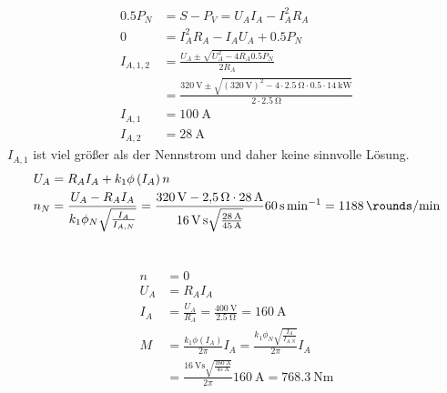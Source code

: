 \documentclass[11pt,a4paper]{scrartcl}
\newcommand{\mybr}[1]{\left(#1\right)}
\newcommand{\0}{_{\mybr{0}}}
\newcommand{\1}{_{\mybr{1}}}
\newcommand{\2}{_{\mybr{2}}}
\begin{document}
\section{}
\begin{align}
\num{0.5}P_N&=S-P_V=U_A I_A - I_A^2 R_A\\
0&=I_A^2 R_A - I_A U_A + \num{0.5}P_N\\
I_{A,1,2}&=\frac{U_A\pm\sqrt{U_A^2-4 R_A \num{0.5}P_N}}{2 R_A}\\
&=\frac{\SI{320}{\volt}\pm\sqrt{\mybr{\SI{320}{\volt}}^2-4 \cdot \SI{2.5}{\ohm}\cdot \num{0.5}\cdot\SI{14}{\kilo\watt}}}{2 \cdot \SI{2.5}{\ohm}}\\
I_{A,1}&=\SI{100}{\ampere}\\
I_{A,2}&=\SI{28}{\ampere}
\end{align}
$I_{A,1}$ ist viel größer als der Nennstrom und daher keine sinnvolle Lösung.
\begin{align}
U_A&=R_A I_A + k_1\phi\mybr{I_A} n\\
n_N&=\frac{U_A-R_A I_A}{k_1\phi_N\sqrt{\frac{I_A}{I_{A,N}}}}=\frac{\SI{320}{\volt}-\SI{2.5}{\ohm}\cdot\SI{28}{\ampere}}{\SI{16}{\volt\second}\sqrt{\frac{\SI{28}{\ampere}}{\SI{45}{\ampere}}}}\SI{60}{\second\per\minute}=\SI{1188}{\rounds\per\minute}
\end{align}

\section{}
\subsection{}
\begin{align}
n&=0\\
U_A&=R_A I_A\\
I_A&=\frac{U_A}{R_A}=\frac{\SI{400}{\volt}}{\SI{2.5}{\ohm}}=\SI{160}{\ampere}\\
M&=\frac{k_1\phi\mybr{I_A}}{2\pi}I_A=\frac{k_1\phi_N\sqrt{\frac{I_A}{I_{A,N}}}}{2\pi}I_A\\
&=\frac{\SI{16}{\volt\second}\sqrt{\frac{\SI{160}{\ampere}}{\SI{45}{\ampere}}}}{2\pi}\SI{160}{\ampere}=\SI{768.3}{\newton\metre}
\end{align}
\end{document}
